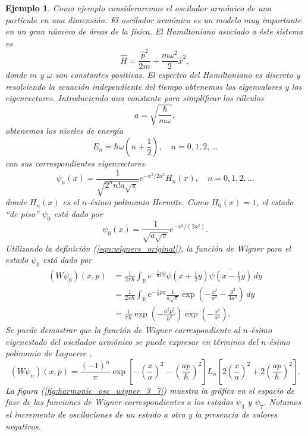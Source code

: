 \documentclass[a4paper,11pt]{report}
\DeclareMathOperator{\R}{\mathbb{R}}
\newtheorem{example}{Ejemplo}
\begin{document}
  \begin{example}
    Como ejemplo consideraremos el oscilador armónico de una
    partícula en una dimensión. El oscilador armónico es un
    modelo muy importante en un gran número de áreas de la
    física.  El Hamiltoniano asociado a éste sistema es
    \begin{equation}
      \hat{H}
      = \frac{\hat{p}^2}{2m} + \frac{m\omega^2}{2}
      \hat{x}^2,
    \end{equation}
    donde $m$ y $\omega$ son constantes positivas. El espectro
    del Hamiltoniano es discreto y resolviendo la ecuación
    independiente del tiempo obtenemos los eigenvalores y los
    eigenvectores. Introduciendo una constante para
    simplificar los cálculos
    \[
      a = \sqrt{\frac{\hbar}{m \omega}},
    \]
    obtenemos los niveles de energía
    \begin{equation}
      E_n
      = \hbar \omega \left( n + \frac{1}{2} \right),
      \quad n = 0,1,2,\ldots
    \end{equation}
    con sus correspondientes eigenvectores
    \begin{equation}
      \psi_n(x)
      = \frac{1}{\sqrt{2^{n} n! a \sqrt{\pi}}} e^{-x^2 / 2a^2}
      H_n(x),
      \quad n = 0, 1, 2,\ldots
    \end{equation}
    donde $H_n(x)$ es el $n$-ésimo polinomio Hermite.
    Como $H_0(x) = 1$, el estado ``de piso'' $\psi_0$ está
    dado por
    \[
      \psi_0(x)
      = \frac{1}{\sqrt{a \sqrt{\pi}}} e^{-x^2 / (2a^2)}.
    \]
    Utilizando la definición (\ref{eqn:wigners_original}), la
    función de Wigner para el estado $\psi_0$ está dado por
    \begin{align*}
      (W\psi_0)(x,p)
      &= \frac{1}{2\pi\hbar} \int_{\R} e^{-\frac{i}{\hbar} p y}
      \psi(x + \tfrac{1}{2}y) \overline{\psi(x -
      \tfrac{1}{2}y)} \, dy \\
      &= \frac{1}{2\pi\hbar} \int_{\R} e^{-\frac{i}{\hbar}py}
      \frac{1}{a\sqrt{\pi}}\exp\left( -\frac{x^2}{a^2} -
      \frac{y^2}{4a^2} \right)  \, dy \\
      &= \frac{1}{\pi\hbar} \exp\left( -\frac{a^2
      p^2}{\hbar^2} \right) \exp\left( -\frac{x^2}{a^2}
      \right). 
    \end{align*}
    Se puede demostrar que la función de Wigner
    correspondiente al $n$-ésimo eigenestado del oscilador
    armónico se puede expresar en términos del $n$-ésimo
    polinomio de Laguerre \cite{zachos2005}, 
    \begin{equation}
      (W\psi_n)(x,p)
      = \frac{(-1)^{n}}{\pi} \exp\left[ -\left( \frac{x}{a}
      \right)^2 - \left( \frac{ap}{\hbar} \right)^2 \right]
      L_n\left[ 2\left( \frac{x}{a} \right)^2 + 2\left(
      \frac{ap}{\hbar} \right)^2 \right].
    \end{equation} 
    La figura (\ref{fig:harmonic_osc_wigner_3_7}) muestra la
    gráfica en el espacio de fase de las funciones de Wigner
    correspondientes a los estados $\psi_3$ y $\psi_7$.
    Notamos el incremento de oscilaciones de un estado a otro
    y la presencia de valores negativos.
    

\end{example}
\end{document}
